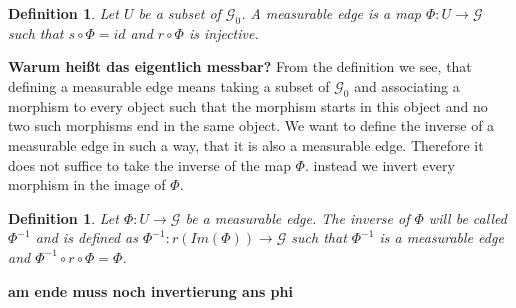 \documentclass[12pt,a4paper]{scrartcl}
\newtheorem{Definition}[Theorem]{Definition}
\numberwithin{equation}{section}
\newcommand{\2}{\mathbb{Z} / 2 \mathbb{Z}}
\newcommand{\G}{\mathcal{G}}
\begin{document}
\begin{Definition}
	Let $U$ be a subset of $\G_0$. A measurable edge is a map $\Phi:U \to \G$ such that $s \circ \Phi = id$ and $r \circ \Phi$ is injective.
\end{Definition}
\textbf{Warum heißt das eigentlich messbar?}
From the definition we see, that defining a measurable edge means taking a subset of $\G_0$ and associating a morphism to every object such that the morphism starts in this object and no two such morphisms end in the same object. We want to define the inverse of a measurable edge in such a way, that it is also a measurable edge. Therefore it does not suffice to take the inverse of the map $\Phi$. instead we invert every morphism in the image of $\Phi$.
\begin{Definition}
	Let $\Phi: U \to \G$ be a measurable edge. The inverse of $\Phi$ will be called $\Phi^{-1}$ and is defined as $\Phi^{-1}:r(Im(\Phi)) \to \G$ such that $\Phi^{-1}$ is a measurable edge and $\Phi^{-1} \circ r \circ \Phi = \Phi$.
\end{Definition}
\textbf{am ende muss noch invertierung ans phi}
\end{document}

